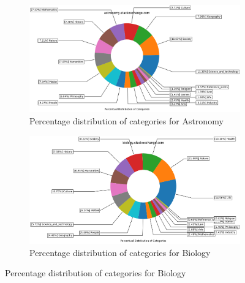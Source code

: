 \begin{figure}[H]
    \centering
	\begin{subfigure}{0.9\textwidth}
    	\centering
        	\includegraphics[width=1\linewidth]{imgs/percentual-distribution/astronomy_stackexchange_com_donut}
        	\caption{Percentage distribution of categories for Astronomy}
        	\label{fig:percentage-distribution-astronomy}
    \end{subfigure}%
    
\par\bigskip %
\par\bigskip %
	\begin{subfigure}{0.9\textwidth}
    \centering
        \includegraphics[width=1\linewidth]{imgs/percentual-distribution/biology_stackexchange_com_donut}
        \caption{Percentage distribution of categories for Biology}
        \label{fig:percentage-distribution-biology}
    \end{subfigure}
 
\end{figure}
    

